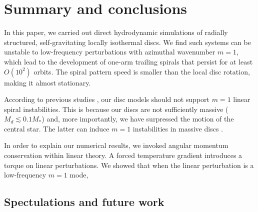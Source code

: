 \section{Summary and conclusions}\label{summary}
In this paper, we carried out direct hydrodynamic simulations of 
radially structured, self-gravitating locally isothermal discs. 
We find such systems can be unstable to low-frequency perturbations
with azimuthal wavenumber $m=1$, which lead to the development of one-arm 
trailing spirals that persist for at least $O(10^2)$ orbits. The 
spiral pattern speed is smaller than the local disc rotation, making
it almost stationary. 

According to previous studies \citep{adams89}, our disc models
should not support $m=1$ linear spiral instabilities. This is because
our discs are not sufficiently massive ($M_d\lesssim 0.1M_*$) and, more
importantly, we have surpressed the motion of the central star. The 
latter can induce $m=1$ instabilities in massive discs  \citep{shu90}.    

In order to explain our numerical results, we invoked   
angular momentum conservation within linear theory. A    
forced temperature gradient introduces a torque on linear
perturbations.  We showed that when the linear perturbation is a
low-frequency $m=1$ mode, 




\subsection{Spectulations and future work}


